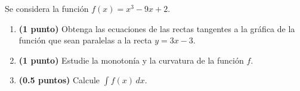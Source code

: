 
Se considera la función $f(x)=x^3-9x+2$.

\begin{enumerate}[label=\alph*)]
  \item \textbf{(1 punto)} Obtenga las ecuaciones de las rectas tangentes a la
  gráfica de la función que sean paralelas a la recta $y=3x-3$.
  \item \textbf{(1 punto)} Estudie la monotonía y la curvatura de la función $f$.
  \item \textbf{(0.5 puntos)} Calcule $\displaystyle\int f(x)\,dx$.
\end{enumerate}

